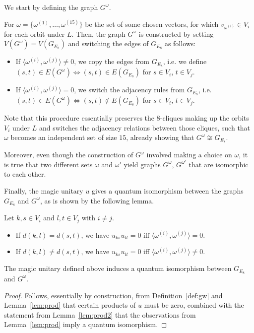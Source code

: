We start by defining the graph $G^{\omega}$.
\begin{definition}\label{def:gw}
    For $\omega = \{ \omega^{(1)}, \dots, \omega^{(15)} \}$ be 
    the set of some chosen vectors, for which $v_{\omega^{(i)}} \in V_i$ for each orbit under $L$.
    Then, the graph $G^{\omega}$ is constructed by setting $V(G^{\omega}) = V(G_{E_8})$
    and switching the edges of $G_{E_8}$ as follows:
    \begin{itemize}
        \item If $\langle \omega^{(i)}, \omega^{(j)} \rangle \neq 0$,
        we copy the edges from $G_{E_8}$, i.e. we define
        $(s, t) \in E(G^\omega) \iff (s, t) \in E(G_{E_8})$
        for $s \in V_i$, $t \in V_j$.
        \item If $\langle \omega^{(i)}, \omega^{(j)} \rangle = 0$,
        we switch the adjacency rules from $G_{E_8}$, i.e. 
        $(s, t) \in E(G^\omega) \iff (s, t) \not \in E(G_{E_8})$
        for $s \in V_i$, $t \in V_j$.
    \end{itemize}
\end{definition}
Note that this procedure essentially preserves the 8-cliques
making up the orbits $V_i$ under $L$ and switches the adjacency relations 
between those cliques, such that $\omega$ becomes an independent set of size $15$, already showing that
$G^\omega \not \cong G_{E_8}$.

Moreover, even though the construction of $G^\omega$ involved making a choice on $\omega$, 
it is true that two different sets $\omega$ and $\omega'$ yield graphs
$G^\omega$, $G^{\omega'}$ that are isomorphic to each other.

Finally, the magic unitary $u$ gives a quantum isomorphism between the
graphs $G_{E_8}$ and $G^\omega$, as is shown by the following lemma.
\begin{lemma}\label{lem:prod}
    Let $k, s \in V_i$ and $l, t \in V_j$ with $i \neq j$.
    \begin{itemize}
        \item If $d(k, l) = d(s, t)$, we have $u_{ks} u_{lt} = 0$ iff $\langle \omega^{(i)}, \omega^{(j)} \rangle = 0$.
        \item If $d(k, l) \neq d(s, t)$, we have $u_{ks} u_{lt} = 0$ iff $\langle \omega^{(i)}, \omega^{(j)} \rangle \neq 0$.
    \end{itemize}
\end{lemma}

\begin{corollary}
    The magic unitary defined above induces a quantum isomorphism between $G_{E_8}$ and $G^\omega$.
\end{corollary}
\begin{proof}
    Follows, essentially by construction, from Definition~\ref{def:gw} and Lemma~\ref{lem:prod} that 
    certain products of $u$ must be zero,
    combined with the statement from Lemma~\ref{lem:prod2} that the observations from Lemma~\ref{lem:prod}
    imply a quantum isomorphism.
\end{proof}


